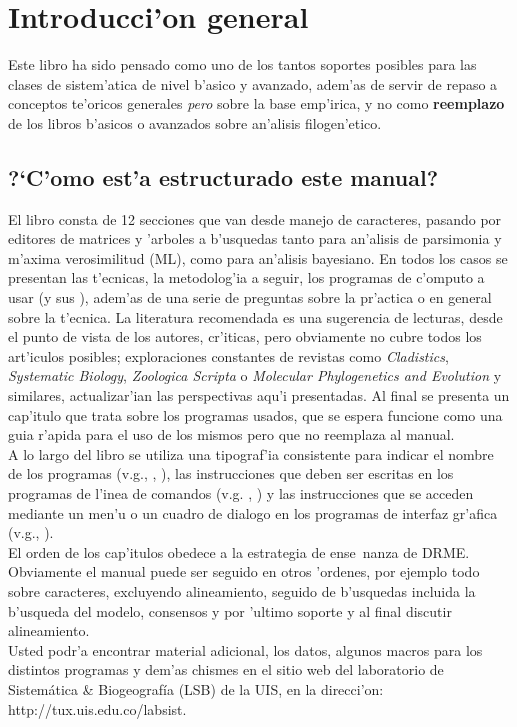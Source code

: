\thispagestyle{empty}
\pagestyle{fancy}
\fancyhead{}
\fancyfoot{}
\renewcommand{\chaptername}{}
\fancyfoot[CE,CO]{\thepage}
\chapter{Introducci'on general}
Este libro ha sido pensado como uno de los tantos soportes posibles para las clases de sistem'atica de nivel b'asico y avanzado, adem'as de servir de repaso a conceptos te'oricos generales \textit{pero} sobre la base emp'irica, y no como \textbf{reemplazo} de los 
libros b'asicos o avanzados sobre an'alisis filogen'etico.
\section*{?`C'omo est'a estructurado este manual?}
El libro consta de 12 secciones que van desde manejo de caracteres, pasando por editores de matrices y 'arboles a b'usquedas tanto para an'alisis de parsimonia y m'axima verosimilitud (ML), como para an'alisis bayesiano. En todos los casos se presentan las t'ecnicas, la metodolog'ia a seguir, los programas de c'omputo a usar (y sus ), adem'as de una serie de preguntas sobre la pr'actica o en general sobre la t'ecnica. La literatura recomendada es una sugerencia de lecturas, desde el punto de vista de los autores, cr'iticas, pero obviamente no cubre todos los art'iculos posibles; exploraciones constantes de revistas como \textit{Cladistics}, \textit{Systematic Biology}, \textit{Zoologica Scripta} o \textit{Molecular Phylogenetics and Evolution} y similares, actualizar'ian las perspectivas aqu'i presentadas. Al final se presenta un cap'itulo que trata sobre los programas usados, que se espera funcione como una guia r'apida para el uso de los mismos pero que no reemplaza al manual.\\
A lo largo del libro se utiliza una tipograf'ia consistente para indicar el nombre de los programas (v.g., , ), las instrucciones que deben ser escritas en los programas de l'inea de comandos (v.g. , ) y las instrucciones que se acceden mediante un men'u o un cuadro de dialogo en los programas de interfaz gr'afica (v.g., ).\\
El orden de los cap'itulos obedece a la estrategia de ense~nanza de DRME. Obviamente el manual puede ser seguido en otros 'ordenes, por ejemplo todo sobre caracteres, excluyendo alineamiento, seguido de b'usquedas incluida la b'usqueda del modelo, consensos y por 'ultimo soporte y al final discutir alineamiento.\\ 
Usted podr'a encontrar material adicional, los datos, algunos macros para los distintos programas y dem'as chismes en el sitio web del laboratorio de Sistem\'atica \& Biogeograf\'ia (LSB) de la UIS, en la direcci'on: http://tux.uis.edu.co/labsist.
